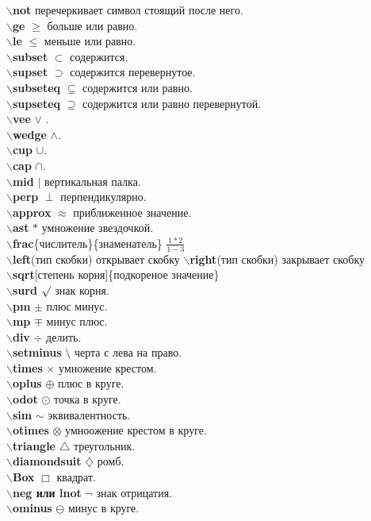 \documentclass{article}
\newcommand{\bs}{$\backslash$}
\newcommand{\bd}[1]{{\bfseries #1}} %
\newcommand{\bb}[1]{\bd{\bs #1}} %
\begin{document}
\bb{not} перечеркивает символ стоящий после него.\\
\bb{ge} $\ge$ больше или равно.\\
\bb{le} $\le$ меньше или равно.\\
\bb{subset} $\subset$ содержится.\\
\bb{supset} $\supset$ содержится перевернутое.\\
\bb{subseteq} $\subseteq$ содержится или равно.\\
\bb{supseteq} $\supseteq$ содержится или равно перевернутой.\\
\bb{vee} $\vee$ .\\
\bb{wedge} $\wedge$.\\
\bb{cup} $\cup$.\\
\bb{cap} $\cap$.\\
\bb{mid} $\mid$ вертикальная палка.\\
\bb{perp} $\perp$ перпендикулярно.\\
\bb{approx} $\approx$ приближенное значение.\\
\bb{ast} $\ast$ умножение звездочкой.\\
\bb{frac}\{числитель\}\{знаменатель\} $\frac{1*2}{1-3}$\\
\bb{left}(тип скобки) открывает скобку \bb{right}(тип скобки) закрывает скобку\\
\bb{sqrt}[степень корня]\{подкореное значение\}\\
\bb{surd} $\surd$ знак корня.\\
\bb{pm} $\pm$ плюс минус.\\
\bb{mp} $\mp$ минус плюс.\\
\bb{div} $\div$ делить.\\
\bb{setminus} $\setminus$ черта с лева на право.\\
\bb{times} $\times$ умножение крестом.\\
\bb{oplus} $\oplus$ плюс в круге.\\
\bb{odot} $\odot$ точка в круге.\\
\bb{sim} $\sim$ эквивалентность.\\
\bb{otimes} $\otimes$ умноожение крестом в круге.\\
\bb{triangle} $\triangle$ треугольник.\\
\bb{diamondsuit} $\diamondsuit$ ромб.\\
\bb{Box} $\Box$ квадрат.\\
\bb{neg или lnot} $\lnot$ знак отрицатия.\\
\bb{ominus} $\ominus$ минус в круге.\\
\end{document}
